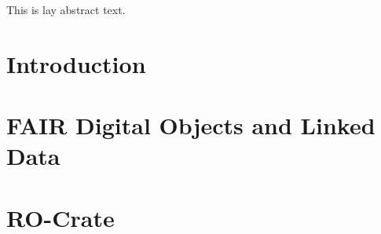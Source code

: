\begin{uomlay} %
  This is lay abstract text. 
  
  \lipsum[1-2]
\end{uomlay}

















\chapter{Introduction}




\chapter{FAIR Digital Objects and Linked Data}



\chapter{RO-Crate}




